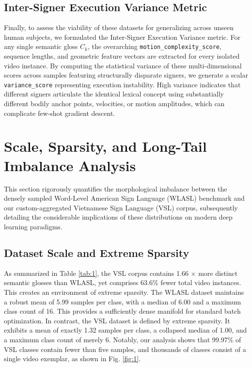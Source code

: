 \documentclass{ieeeaccess}
\begin{document}
\subsection{Inter-Signer Execution Variance Metric} 
Finally, to assess the viability of these datasets for generalizing across unseen human subjects, we formulated the Inter-Signer Execution Variance metric. For any single semantic gloss $C_k$, the overarching \texttt{motion\_complexity\_score}, sequence lengths, and geometric feature vectors are extracted for every isolated video instance. By computing the statistical variance of these multi-dimensional scores across samples featuring structurally disparate signers, we generate a scalar \texttt{variance\_score} representing execution instability. High variance indicates that different signers articulate the identical lexical concept using substantially different bodily anchor points, velocities, or motion amplitudes, which can complicate few-shot gradient descent.

\section{Scale, Sparsity, and Long-Tail Imbalance Analysis}
\label{sec:scale}

This section rigorously quantifies the morphological imbalance between the densely sampled Word-Level American Sign Language (WLASL) benchmark and our custom-aggregated Vietnamese Sign Language (VSL) corpus, subsequently detailing the considerable implications of these distributions on modern deep learning paradigms.

\subsection{Dataset Scale and Extreme Sparsity}
As summarized in Table \ref{tab:1}, the VSL corpus contains 1.66 $\times$ more distinct semantic glosses than WLASL, yet comprises 63.6\% fewer total video instances. This creates an environment of extreme sparsity. The WLASL dataset maintains a robust mean of 5.99 samples per class, with a median of 6.00 and a maximum class count of 16. This provides a sufficiently dense manifold for standard batch optimization. In contrast, the VSL dataset is defined by extreme sparsity. It exhibits a mean of exactly 1.32 samples per class, a collapsed median of 1.00, and a maximum class count of merely 6. Notably, our analysis shows that 99.97\% of VSL classes contain fewer than five samples, and thousands of classes consist of a single video exemplar, as shown in Fig. \ref{fig:1}.
\end{document}
